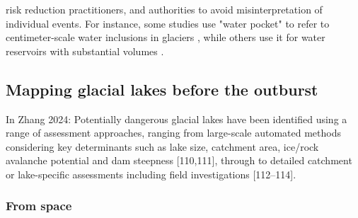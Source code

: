 risk reduction practitioners, and authorities to avoid misinterpretation of individual events. For instance, some studies use "water pocket" to refer to centimeter-scale water inclusions in glaciers \citep[e.g.][]{Vivian&Bocquet1973,Raymond&Harrison1975,Holmlund1988,Fountain&Walder1998,Murray&al2000b}, while others use it for water reservoirs with substantial volumes \citep[][]{Beecroft1983, Haeberli&al1989,Tweed&Russel1999,Vincent&al2010b}. 






\subsection{Mapping glacial lakes before the outburst}%

In Zhang 2024: Potentially dangerous glacial lakes have been identified using a range of assessment approaches, ranging from large-scale automated methods considering key determinants such as lake size, catchment area, ice/rock avalanche potential and dam steepness [110,111], through to detailed catchment or lake-specific assessments including field investigations [112–114]. 

\subsubsection{From space}

